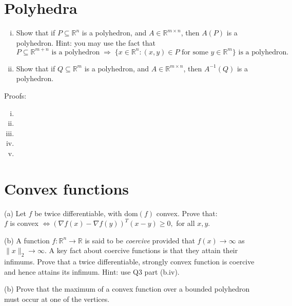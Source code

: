 \documentclass{article}
\theoremstyle{remark}
\theoremstyle{definition}
\def\R{\mathbb{R}}
\begin{document}
\section{Polyhedra}%
\label{sec:polyhedra}

\begin{enumerate}[i.]
\item Show that if $P \subseteq \R^n$ is a polyhedron, and $A \in \R^{m \times
    n}$, then $A(P)$ is a polyhedron. Hint: you may use the fact that 
  $$
  \text{$P \subseteq \R^{m+n}$ is a polyhedron} 
  \; \Rightarrow \;
  \text{$\{x\in \R^n : \text{$(x,y)\in P$ for some $y\in\R^m$}\}$ 
    is a polyhedron}.
  $$
\item Show that if $Q \subseteq \R^m$ is a polyhedron, and $A \in \R^{m \times
    n}$, then $A^{-1}(Q)$ is a polyhedron. 
\end{enumerate}


\begin{tcolorbox}
Proofs:\\

\begin{enumerate}[i.]
\item 
\item 
\item 
\item 
\item 
\end{enumerate}
\end{tcolorbox}





\section{Convex functions}




\bigskip
\noindent
(a) Let $f$ be twice differentiable, with $\mathrm{dom}(f)$ convex.
Prove that: \\

$f$ is convex $\iff (\nabla f(x) - \nabla f(y))^T (x-y) \geq 0,$ for all $x,y$. 


\bigskip
\noindent
(b) A function $f : \R^n \to \R$ is said to be {\it coercive} provided
that $f(x) \to \infty$ as $\|x\|_2 \to \infty$.  A key fact about coercive
functions is that they attain their infimums.  Prove that a twice
differentiable, strongly convex function is coercive and hence attains its
infimum. Hint: use Q3 part (b.iv).  

\bigskip
\noindent
(b) Prove that the maximum of a convex function over a bounded
polyhedron must occur at one of the vertices.
\end{document}
